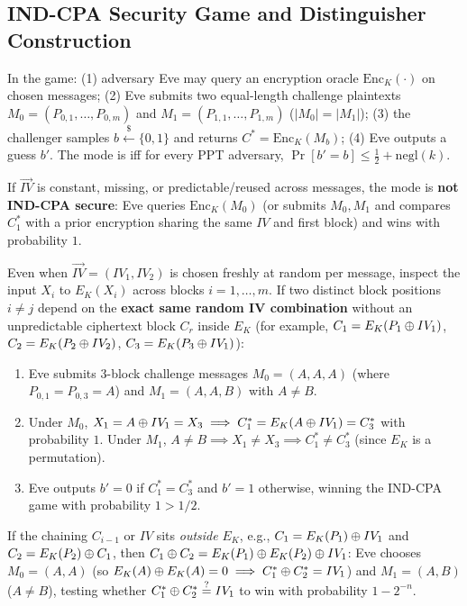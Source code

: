 \subsection{IND-CPA Security Game and Distinguisher Construction}
In the  game: (1) adversary Eve may query an encryption oracle $\mathrm{Enc}_K(\cdot)$ on chosen messages; (2) Eve submits two equal-length challenge plaintexts $M_0 = (P_{0,1}, \dots, P_{0,m})$ and $M_1 = (P_{1,1}, \dots, P_{1,m})$ ($|M_0| = |M_1|$); (3) the challenger samples $b \xleftarrow{\$} \{0,1\}$ and returns $C^* = \mathrm{Enc}_K(M_b)$; (4) Eve outputs a guess $b'$. The mode is  iff for every PPT adversary, $\Pr[b' = b] \le \frac{1}{2} + \mathrm{negl}(k)$.
\begin{compactitem}
  \item {} If $\overrightarrow{IV}$ is constant, missing, or predictable/reused across messages, the mode is \textbf{not IND-CPA secure}: Eve queries $\mathrm{Enc}_K(M_0)$ (or submits $M_0, M_1$ and compares $C_1^*$ with a prior encryption sharing the same $IV$ and first block) and wins with probability $1$.
  \item {} Even when $\overrightarrow{IV} = (IV_1, IV_2)$ is chosen freshly at random per message, inspect the input $X_i$ to $E_K(X_i)$ across blocks $i = 1, \dots, m$. If two distinct block positions $i \neq j$ depend on the \textbf{exact same random IV combination} without an unpredictable ciphertext block $C_r$ inside $E_K$ (for example, $C_1 = E_K(P_1 \oplus IV_1)$, $C_2 = E_K(P_2 \oplus IV_2)$, $C_3 = E_K(P_3 \oplus IV_1)$):
  \begin{enumerate}[label=\arabic*., leftmargin=1.5em]
    \item Eve submits 3-block challenge messages $M_0 = (A, A, A)$ (where $P_{0,1} = P_{0,3} = A$) and $M_1 = (A, A, B)$ with $A \neq B$.
    \item Under $M_0$, $X_1 = A \oplus IV_1 = X_3 \implies C_1^* = E_K(A \oplus IV_1) = C_3^*$ with probability $1$. Under $M_1$, $A \neq B \implies X_1 \neq X_3 \implies C_1^* \neq C_3^*$ (since $E_K$ is a permutation).
    \item Eve outputs $b' = 0$ if $C_1^* = C_3^*$ and $b' = 1$ otherwise, winning the IND-CPA game with probability $1 > 1/2$.
  \end{enumerate}
  \item {} If the chaining $C_{i-1}$ or $IV$ sits \emph{outside} $E_K$, e.g., $C_1 = E_K(P_1) \oplus IV_1$ and $C_2 = E_K(P_2) \oplus C_1$, then $C_1 \oplus C_2 = E_K(P_1) \oplus E_K(P_2) \oplus IV_1$: Eve chooses $M_0 = (A, A)$ (so $E_K(A) \oplus E_K(A) = 0 \implies C_1^* \oplus C_2^* = IV_1$) and $M_1 = (A, B)$ ($A \neq B$), testing whether $C_1^* \oplus C_2^* \stackrel{?}{=} IV_1$ to win with probability $1 - 2^{-n}$.

\end{compactitem}
